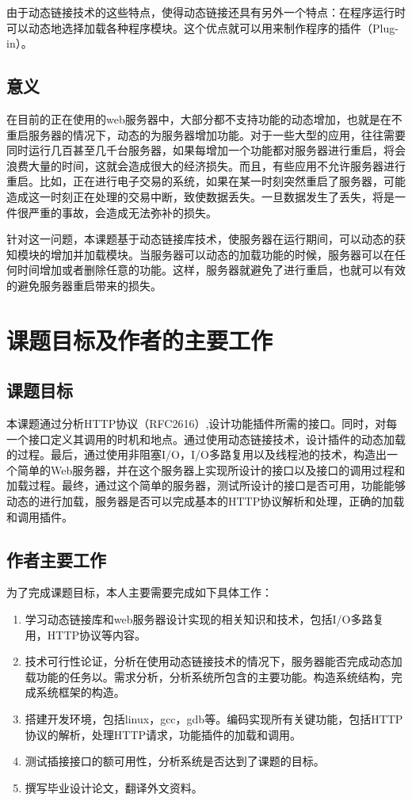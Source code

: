 \documentclass[twoside, xetex]{report}
\begin{document}
	由于动态链接技术的这些特点，使得动态链接还具有另外一个特点：在程序运行时可以动态地选择加载各种程序模块。这个优点就可以用来制作程序的插件（Plug-in）。
	
\subsection{意义}
	在目前的正在使用的web服务器中，大部分都不支持功能的动态增加，也就是在不重启服务器的情况下，动态的为服务器增加功能。对于一些大型的应用，往往需要同时运行几百甚至几千台服务器，如果每增加一个功能都对服务器进行重启，将会浪费大量的时间，这就会造成很大的经济损失。而且，有些应用不允许服务器进行重启。比如，正在进行电子交易的系统，如果在某一时刻突然重启了服务器，可能造成这一时刻正在处理的交易中断，致使数据丢失。一旦数据发生了丢失，将是一件很严重的事故，会造成无法弥补的损失。
	
	针对这一问题，本课题基于动态链接库技术，使服务器在运行期间，可以动态的获知模块的增加并加载模块。当服务器可以动态的加载功能的时候，服务器可以在任何时间增加或者删除任意的功能。这样，服务器就避免了进行重启，也就可以有效的避免服务器重启带来的损失。
	
\section{课题目标及作者的主要工作}
	\subsection{课题目标}
	本课题通过分析HTTP协议（RFC2616）,设计功能插件所需的接口。同时，对每一个接口定义其调用的时机和地点。通过使用动态链接技术，设计插件的动态加载的过程。最后，通过使用非阻塞I/O，I/O多路复用以及线程池的技术，构造出一个简单的Web服务器，并在这个服务器上实现所设计的接口以及接口的调用过程和加载过程。最终，通过这个简单的服务器，测试所设计的接口是否可用，功能能够动态的进行加载，服务器是否可以完成基本的HTTP协议解析和处理，正确的加载和调用插件。
	
	\subsection{作者主要工作}
	为了完成课题目标，本人主要需要完成如下具体工作：
	\begin{enumerate}
		\item 学习动态链接库和web服务器设计实现的相关知识和技术，包括I/O多路复用，HTTP协议等内容。                                
		\item 技术可行性论证，分析在使用动态链接技术的情况下，服务器能否完成动态加载功能的任务以。需求分析，分析系统所包含的主要功能。构造系统结构，完成系统框架的构造。
		\item 搭建开发环境，包括linux，gcc，gdb等。编码实现所有关键功能，包括HTTP协议的解析，处理HTTP请求，功能插件的加载和调用。 
		\item 测试插接接口的额可用性，分析系统是否达到了课题的目标。
		\item 撰写毕业设计论文，翻译外文资料。     
	\end{enumerate}
	
\end{document}
